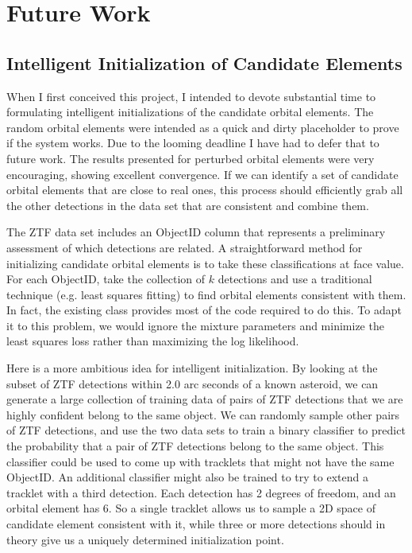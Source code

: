 \section{Future Work}
\label{section_future_work}

\subsection{Intelligent Initialization of Candidate Elements}
\label{subsection_intelligent_initialization}
When I first conceived this project, I intended to devote substantial time to formulating intelligent initializations of the candidate orbital elements.
The random orbital elements were intended as a quick and dirty placeholder to prove if the system works.
Due to the looming deadline I have had to defer that to future work.
The results presented for perturbed orbital elements were very encouraging, showing excellent convergence.
If we can identify a set of candidate orbital elements that are close to real ones, this process should efficiently grab
all the other detections in the data set that are consistent and combine them.

The ZTF data set includes an ObjectID column that represents a preliminary assessment of which detections are related.
A straightforward method for initializing candidate orbital elements is to take these classifications at face value.
For each ObjectID, take the collection of $k$ detections and use a traditional technique (e.g. least squares fitting) to find orbital elements consistent with them.
In fact, the existing  class provides most of the code required to do this.
To adapt it to this problem, we would ignore the mixture parameters and minimize the least squares loss rather than maximizing the log likelihood.

Here is a more ambitious idea for intelligent initialization.
By looking at the subset of ZTF detections within 2.0 arc seconds of a known asteroid, we can generate a large collection of training data
of pairs of ZTF detections that we are highly confident belong to the same object.
We can randomly sample other pairs of ZTF detections, and use the two data sets to train a binary classifier to predict 
the probability that a pair of ZTF detections belong to the same object.
This classifier could be used to come up with tracklets that might not have the same ObjectID.
An additional classifier might also be trained to try to extend a tracklet with a third detection.
Each detection has 2 degrees of freedom, and an orbital element has 6.
So a single tracklet allows us to sample a 2D space of candidate element consistent with it,
while three or more detections should in theory give us a uniquely determined initialization point.

